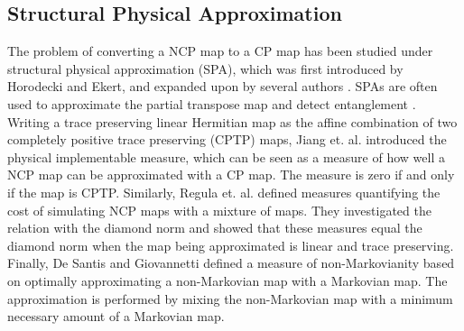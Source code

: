 \documentclass[12pt]{iopart}
\begin{document}
\subsection{Structural Physical Approximation}
The problem of converting a NCP map to a CP map has been studied under structural physical approximation (SPA), which was first introduced by Horodecki and Ekert, and expanded upon by several authors \cite{Horodecki_Ekert_2002, horodecki2001limits,  fiurasek2002spa, Alves_Horodecki_Oi_Kwek_Ekert_2003, horodecki2003QuantEnt, Horodecki2003LimitsOp, Augusiak_2011SPA, Lim2012QutritSPA, Bae2017SPAReview, adhikari2018SPA, kumari2019}. SPAs are often used to approximate the partial transpose map and detect entanglement \cite{Chruscinski2009EntWit, korbicz2008SPABreak, chruscinski2010EntWit, Chruscinski2011EntWit, Augusiak_2011SPA, lim2011ExpSPA, wang2011EntWitFromDensMat, lim2011ExperPartTrans, STORMER2013SepStatesSPA, wang2013SPAEntWit, Kalev2013ApproxTrans, Chruciski2014EntWit, Chrusciski2014DispSPAConj, Adhikari2018EntNegat, Bae2019EntDet}. Writing a trace preserving linear Hermitian map as the affine combination of two completely positive trace preserving (CPTP) maps, Jiang et. al. \cite{jiang_2020_PhysicalImplementOfQuantMapsAndItsAppInErrorMitigation} introduced the physical implementable measure, which can be seen as a measure of how well a NCP map can be approximated with a CP map. The measure is zero if and only if the map is CPTP. Similarly, Regula et. al. \cite{Regula_2021_OperationalAppOfTheDiamondNormAndRelatedMeasInQuantifTheNonPhysOfQuantMaps} defined measures quantifying the cost of simulating NCP maps with a mixture of maps. They investigated the relation with the diamond norm and showed that these measures equal the diamond norm when the map being approximated is linear and trace preserving. Finally, De Santis and Giovannetti \cite{DeSantis_2021_MeasNonMarkovViaIncoherentMixWithMarkovDynamics} defined a measure of non-Markovianity based on optimally approximating a non-Markovian map with a Markovian map. The approximation is performed by mixing the non-Markovian map with a minimum necessary amount of a Markovian map.
\end{document}
